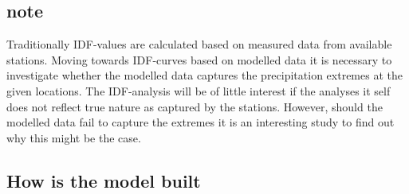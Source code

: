 \subsection{note}
Traditionally IDF-values are calculated based on measured data from available stations. Moving towards IDF-curves based on modelled data it is necessary to investigate whether the modelled data captures the precipitation extremes at the given locations. The IDF-analysis will be of little interest if the analyses it self does not reflect true nature as captured by the stations. However, should the modelled data fail to capture the extremes it is an interesting study to find out why this might be the case.   

\subsection{How is the model built}